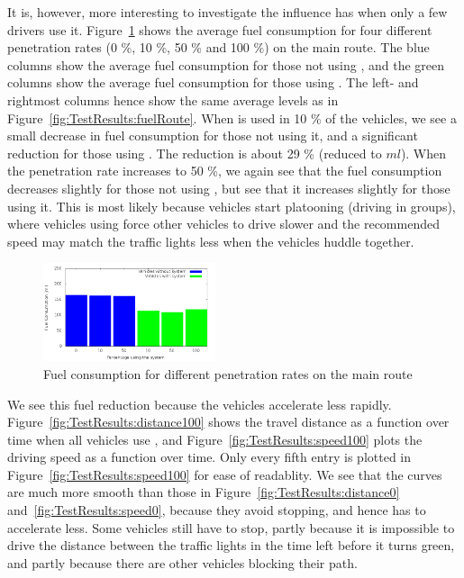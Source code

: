 It is, however, more interesting to investigate the influence \tech has when only a few drivers use it.
Figure~\ref{fig:TestResults:combinedFuel} shows the average fuel consumption for four different penetration rates (0 \%, 10 \%, 50 \% and 100 \%) on the main route.
The blue columns show the average fuel consumption for those not using \tech, and the green columns show the average fuel consumption for those using \tech.
The left- and rightmost columns hence show the same average levels as in Figure~\ref{fig:TestResults:fuelRoute}.
When \tech is used in 10 \% of the vehicles, we see a small decrease in fuel consumption for those not using it, and a significant reduction for those using \tech.
The reduction is about 29 \% (reduced to $ml$).
When the penetration rate increases to 50 \%, we again see that the fuel consumption decreases slightly for those not using \tech, but see that it increases slightly for those using it.
This is most likely because vehicles start platooning (driving in groups), where vehicles using \tech force other vehicles to drive slower and the recommended speed may match the traffic lights less when the vehicles huddle together.

\begin{figure}[htb]
\includegraphics[width=0.45\textwidth]{../images/tp0c1_0/combinedFuel.png}
\caption{Fuel consumption for different penetration rates on the main route}
\label{fig:TestResults:combinedFuel}
\end{figure}

We see this fuel reduction because the vehicles accelerate less rapidly. 
Figure~\ref{fig:TestResults:distance100} shows the travel distance as a function over time when all vehicles use \tech, and Figure~\ref{fig:TestResults:speed100} plots the driving speed as a function over time. 
Only every fifth entry is plotted in Figure~\ref{fig:TestResults:speed100} for ease of readablity.
We see that the curves are much more smooth than those in Figure~\ref{fig:TestResults:distance0} and~\ref{fig:TestResults:speed0}, because they avoid stopping, and hence has to accelerate less.
Some vehicles still have to stop, partly because it is impossible to drive the distance between the traffic lights in the time left before it turns green, and partly because there are other vehicles blocking their path.

